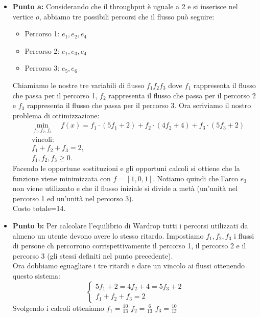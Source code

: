 \documentclass[a4paper,12pt]{article}
\begin{document}
		\begin{itemize}
			\item \textbf{Punto a: }Considerando che il throughput è uguale a 2 e si inserisce nel vertice $o$, abbiamo tre possibili percorsi che il flusso può seguire:
			\begin{itemize}
				\item Percorso 1: $e_1, e_2, e_4$
				\item Percorso 2: $e_1, e_3, e_4$
				\item Percorso 3: $e_5, e_6$
			\end{itemize}
			Chiamiamo le nostre tre variabili di flusso $f_1f_2f_3$ dove $f_1$ rappresenta il flusso che passa per il percorso 1, $f_2$ rappresenta il flusso che passa per il percorso 2 e $f_3$ rappresenta il flusso che passa per il percorso 3. Ora scriviamo il nostro problema di ottimizzazione:\\
			\[
			\begin{aligned}
				&\min_{f_1, f_2, f_3} \quad f(x) = f_1 \cdot (5f_1+2) + f_2 \cdot (4f_2+4) + f_3 \cdot(5f_3+2) \\
				&\text{vincoli:} \\
				&f_1 + f_2 + f_3= 2, \\
				&f_1,f_2,f_3 \geq 0.
			\end{aligned}
			\]
			Facendo le opportune sostituzioni e gli opportuni calcoli si ottiene che la funzione viene minimizzata con $f=[1,0,1]$. Notiamo quindi che l'arco $e_3$ non viene utilizzato e che il flusso iniziale si divide a metà (un'unità nel percorso 1 ed un'unità nel percorso 3).\\
			Costo totale=14.
			\item \textbf{Punto b: }Per calcolare l'equilibrio di Wardrop tutti i percorsi utilizzati da almeno un utente devono avere lo stesso ritardo. Impostiamo $f_1, f_2, f_3$ i flussi di persone ch percorrono corrispettivamente il percorso 1, il percorso 2 e il percorso 3 (gli stessi definiti nel punto precedente).\\
			Ora dobbiamo eguagliare i tre ritardi e dare un vincolo ai flussi ottenendo questo sistema:\\
			\begin{equation}
				\begin{cases}
					5f_1+2=4f_2+4=5f_3+2 \\
					f_1+f_2+f_3=2
				\end{cases}
			\end{equation}
			Svolgendo i calcoli otteniamo $f_1=\frac{10}{13}$ $f_2=\frac{6}{13}$ $f_3=\frac{10}{13}$\\

\end{itemize}
\end{document}

